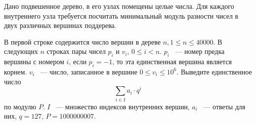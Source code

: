 Дано подвешенное дерево, в его узлах помещены целые числа.
Для каждого внутреннего узла требуется посчитать минимальный
модуль разности чисел в двух различных вершинах поддерева.

\InputFile
В первой строке содержится число вершин в дереве $n, 1 \le n \le 40000$.
В следующих $n$ строках пары чисел $p_i$ и $v_i$, $0 \le i < n$. $p_i$ ~---
номер предка вершины с номером $i$, если $p_i = -1$, то эта единственная
вершина является корнем. $v_i$ ~--- число, записанное в вершине
$0 \le v_i \le 10^6$.
\OutputFile
Выведите единственное число
$$
    \sum_{i \in I} a_i\cdot q^i
$$ по модулю $P$.
$I$ ~--- множество индексов внутренних вершин,
$a_i$ ~--- ответы для них,
$q =127$, $P = 1000000007$.

